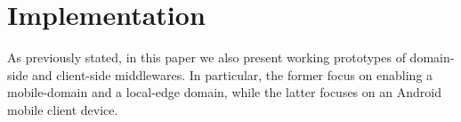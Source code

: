 \section{Implementation}\label{sec:implementation}

As previously stated, in this paper we also present working prototypes of domain-side and client-side middlewares. In particular, the former focus on enabling a mobile-domain and a local-edge domain, while the latter focuses on an Android mobile client device. 


